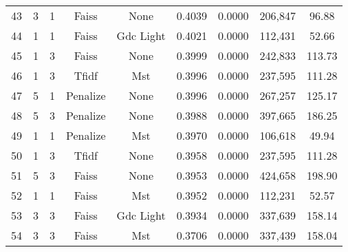 \begin{longtable}{@{}ccccccccc@{}}
43 & 3 & 1 & Faiss & None & 0.4039 & 0.0000 & 206,847 & 96.88 \\
44 & 1 & 1 & Faiss & Gdc Light & 0.4021 & 0.0000 & 112,431 & 52.66 \\
45 & 1 & 3 & Faiss & None & 0.3999 & 0.0000 & 242,833 & 113.73 \\
46 & 1 & 3 & Tfidf & Mst & 0.3996 & 0.0000 & 237,595 & 111.28 \\
47 & 5 & 1 & Penalize & None & 0.3996 & 0.0000 & 267,257 & 125.17 \\
48 & 5 & 3 & Penalize & None & 0.3988 & 0.0000 & 397,665 & 186.25 \\
49 & 1 & 1 & Penalize & Mst & 0.3970 & 0.0000 & 106,618 & 49.94 \\
50 & 1 & 3 & Tfidf & None & 0.3958 & 0.0000 & 237,595 & 111.28 \\
51 & 5 & 3 & Faiss & None & 0.3953 & 0.0000 & 424,658 & 198.90 \\
52 & 1 & 1 & Faiss & Mst & 0.3952 & 0.0000 & 112,231 & 52.57 \\
53 & 3 & 3 & Faiss & Gdc Light & 0.3934 & 0.0000 & 337,639 & 158.14 \\
54 & 3 & 3 & Faiss & Mst & 0.3706 & 0.0000 & 337,439 & 158.04 \\
\end{longtable}